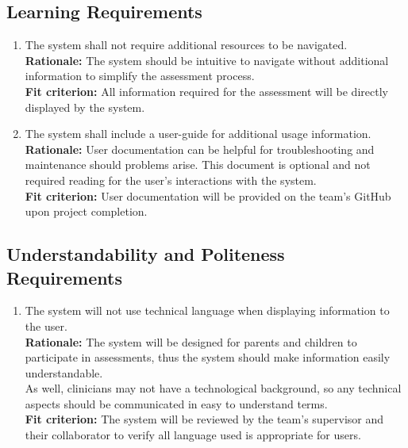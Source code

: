 \documentclass[12pt]{article}
\begin{document}
\subsection{Learning Requirements}
\begin{enumerate}[label={UH-LI\arabic*}. ]
  \item The system shall not require additional resources to be navigated.\\
  \textbf{Rationale: }The system should be intuitive to navigate without additional information to simplify the assessment process.\\
  \textbf{Fit criterion: }All information required for the assessment will be directly displayed by the system.
  \item The system shall include a user-guide for additional usage information.\\
  \textbf{Rationale: }User documentation can be helpful for troubleshooting and maintenance should problems arise. This document is optional and not required reading for the user's interactions with the system.\\
  \textbf{Fit criterion: }User documentation will be provided on the team's GitHub upon project completion.
\end{enumerate}
\subsection{Understandability and Politeness Requirements}
\begin{enumerate}[label={UH-UP\arabic*}. ]
  \item The system will not use technical language when displaying information to the user.\\
  \textbf{Rationale: }The system will be designed for parents and children to participate in assessments, thus the system should make information easily understandable.\\
  As well, clinicians may not have a technological background, so any technical aspects should be communicated in easy to understand terms.\\
  \textbf{Fit criterion: }The system will be reviewed by the team's supervisor and their collaborator to verify all language used is appropriate for users.
\end{enumerate}
\end{document}
